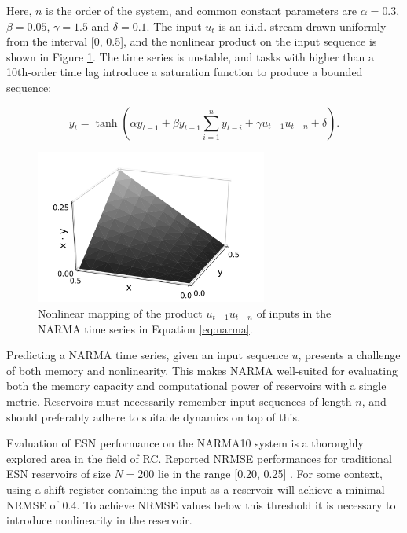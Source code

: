 Here, $n$ is the order of the system, and common constant parameters are $\alpha
= 0.3$, $\beta = 0.05$, $\gamma = 1.5$ and $\delta = 0.1$. The input $u_{t}$ is
an i.i.d. stream drawn uniformly from the interval [0, 0.5], and the nonlinear
product on the input sequence is shown in Figure
\ref{fig:narma-nonlinearity}. The time series is unstable, and tasks with higher
than a 10th-order time lag introduce a saturation function to produce a bounded
sequence:

\begin{equation}
  y_{t} =
  \tanh(
  \alpha y_{t-1} +
  \beta y_{t-1} \sum_{i=1}^{n}y_{t-i} +
  \gamma u_{t-1}u_{t-n} +
  \delta
  )
  .
  \label{eq:narma-tanh}
\end{equation}

\begin{figure}[t!]
  \centering
  \includegraphics[width=3.0in]{figures/NARMA-nonlinearity.png}
  \caption{
    Nonlinear mapping of the product $u_{t-1}u_{t-n}$ of inputs in the NARMA
time series in Equation \protect\ref{eq:narma}.
  }
  \label{fig:narma-nonlinearity}
\end{figure}

Predicting a NARMA time series, given an input sequence $u$, presents a
challenge of both memory and nonlinearity. This makes NARMA well-suited for
evaluating both the memory capacity and computational power of reservoirs with a
single metric. Reservoirs must necessarily remember input sequences of length
$n$, and should preferably adhere to suitable dynamics on top of this.

Evaluation of ESN performance on the NARMA10 system is a thoroughly explored
area in the field of RC. Reported NRMSE performances for traditional ESN
reservoirs of size $N = 200$ lie in the range [0.20, 0.25]
\cite{verstraeten_experimental_2007, rodan_minimum_2011,
goudarzi_comparative_2014, jaeger_adaptive_2003}. For some context, using a
shift register containing the input as a reservoir will achieve a minimal NRMSE
of 0.4. To achieve NRMSE values below this threshold it is necessary to
introduce nonlinearity in the reservoir.

